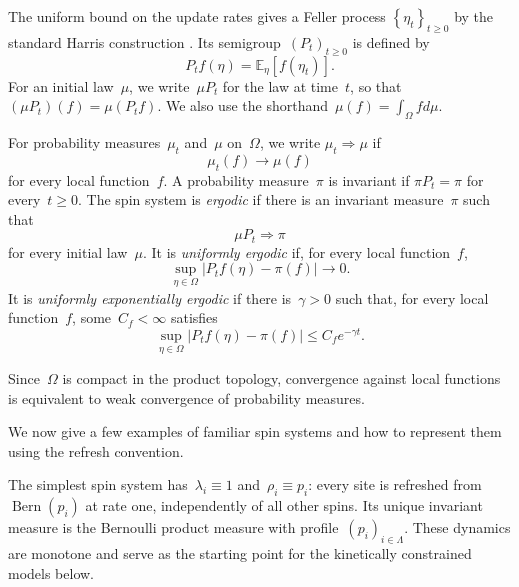 \documentclass[EJP,preprint,NODS,nobera]{ejpecp}
\newcommand{\E}{\mathbb{E}}
\newcommand{\Cb}[1]{\left[#1\right]}
\newcommand{\cb}[1]{\left\{#1\right\}}
\newcommand{\abs}[1]{\left|#1\right|}
\begin{document}
The uniform bound on the update rates gives a Feller process
$\cb{\eta_t}_{t\geq0}$ by the standard Harris construction
\cite{Harris1978,Liggett1985}. Its semigroup~$(P_t)_{t\geq0}$ is defined by
\begin{equation*}
P_tf(\eta)=\E_\eta\Cb{f(\eta_t)}.
\end{equation*}
For an initial law~$\mu$, we write~$\mu P_t$ for the law at time~$t$, so that
$(\mu P_t)(f)=\mu(P_tf)$. We also use the shorthand~$\mu(f) = \int_\Omega f d\mu$.

\begin{definition}
For probability measures~$\mu_t$ and~$\mu$ on~$\Omega$, we write
$\mu_t\Rightarrow\mu$ if
\begin{equation*}
\mu_t(f)\longrightarrow\mu(f)
\end{equation*}
for every local function~$f$. A probability measure~$\pi$ is invariant if
$\pi P_t=\pi$ for every~$t\geq0$. The spin system is \emph{ergodic} if there
is an invariant measure~$\pi$ such that
\begin{equation*}
\mu P_t\Rightarrow\pi
\end{equation*}
for every initial law~$\mu$. It is \emph{uniformly ergodic} if, for every local
function~$f$,
\begin{equation*}
\sup_{\eta\in\Omega}
\abs{P_tf(\eta)-\pi(f)}
\longrightarrow0.
\end{equation*}
It is \emph{uniformly exponentially ergodic} if there is~$\gamma>0$ such that,
for every local function~$f$, some~$C_f<\infty$ satisfies
\begin{equation*}
\sup_{\eta\in\Omega}
\abs{P_tf(\eta)-\pi(f)}
\leq C_fe^{-\gamma t}.
\end{equation*}
\end{definition}

\begin{remark}
Since~$\Omega$ is compact in the product topology, convergence against local
functions is equivalent to weak convergence of probability measures.
\end{remark}

We now give a few examples of familiar spin systems and how to represent them using the refresh convention.

\begin{example}
The simplest spin system has~$\lambda_i\equiv1$ and~$\rho_i\equiv p_i$:
every site is refreshed from~$\operatorname{Bern}(p_i)$ at rate one,
independently of all other spins. Its unique invariant measure is the
Bernoulli product measure with profile~$(p_i)_{i\in\Lambda}$. These dynamics
are monotone and serve as the starting point for the kinetically constrained
models below.
\end{example}
\end{document}
